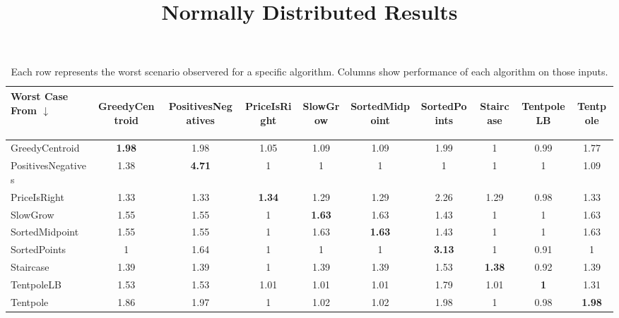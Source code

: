 \documentclass[11pt,twocolumn]{article}
\begin{document}
\begin{table*}
  \title{\textbf{Normally Distributed Results} \vspace{12pt} } 
\begin{tabular}{|l|ccccccccc|}
\hline
Worst Case From $\downarrow$
 & \begin{sideways} GreedyCentroid \end{sideways}
 & \begin{sideways} PositivesNegatives \end{sideways}
 & \begin{sideways} PriceIsRight \end{sideways}
 & \begin{sideways} SlowGrow \end{sideways}
 & \begin{sideways} SortedMidpoint \end{sideways}
 & \begin{sideways} SortedPoints \end{sideways}
 & \begin{sideways} Staircase \end{sideways}
 & \begin{sideways} TentpoleLB \end{sideways}
 & \begin{sideways} Tentpole \end{sideways}
 \\ \hline
GreedyCentroid & \textbf{1.98} & 1.98 & 1.05 & 1.09 & 1.09 & 1.99 & 1 & 0.99 & 1.77\\ 
PositivesNegatives & 1.38 & \textbf{4.71} & 1 & 1 & 1 & 1 & 1 & 1 & 1.09\\ 
PriceIsRight & 1.33 & 1.33 & \textbf{1.34} & 1.29 & 1.29 & 2.26 & 1.29 & 0.98 & 1.33\\ 
SlowGrow & 1.55 & 1.55 & 1 & \textbf{1.63} & 1.63 & 1.43 & 1 & 1 & 1.63\\ 
SortedMidpoint & 1.55 & 1.55 & 1 & 1.63 & \textbf{1.63} & 1.43 & 1 & 1 & 1.63\\ 
SortedPoints & 1 & 1.64 & 1 & 1 & 1 & \textbf{3.13} & 1 & 0.91 & 1\\ 
Staircase & 1.39 & 1.39 & 1 & 1.39 & 1.39 & 1.53 & \textbf{1.38} & 0.92 & 1.39\\ 
TentpoleLB & 1.53 & 1.53 & 1.01 & 1.01 & 1.01 & 1.79 & 1.01 & \textbf{1} & 1.31\\ 
Tentpole & 1.86 & 1.97 & 1 & 1.02 & 1.02 & 1.98 & 1 & 0.98 & \textbf{1.98}\\ 
\hline 
 \end{tabular}
  \caption{Each row represents the worst scenario observered for a specific algorithm.  Columns show performance of each algorithm on those inputs.}
  \label{table:worstCases}
\end{table*}
\end{document}
